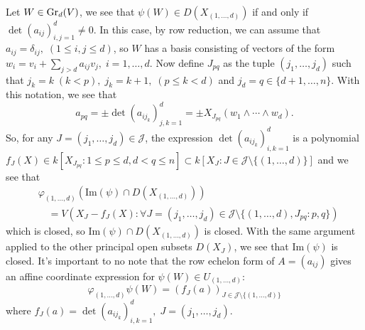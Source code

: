 Let $W\in\text{Gr}_d(V)$, we see that 
$\psi(W)\in D(X_{(1,\dots,d)})$ if and only if $\det(a_{ij})_{i,j=1}^d\neq0$. In this case, by row reduction, we can assume 
that $a_{ij}=\delta_{ij},\;(1\leq i,j\leq d)$, so $W$ has a basis 
consisting of vectors of the form $w_i = v_i+\sum_{j>d}a_{ij}v_j,\;i=1,\dots,d$. Now define $J_{pq}$ as the tuple 
$(j_1,\dots, j_d)$ such that $j_k=k\;(k < p),\;j_{k}=k+1,\;(p\leq k<d)$ and $j_d=q\in\{d+1,\dots,n\}$. With this notation, we 
see that 
\begin{equation}\label{equation: a_pq coefficients}
    a_{pq}=\pm\det(a_{ij_k})_{j,k=1}^d=\pm X_{J_{pq}}(w_1\wedge\cdots\wedge w_d).
\end{equation}
So, for any 
$J=(j_1,\dots,j_d)\in\mathcal{J}$, the expression $\det(a_{ij_k})_{i,k=1}^d$ is a polynomial 
$f_J(X)\in k[X_{J_{pq}}: 1\leq p\leq d, d<q\leq n]\subset k[X_J:J\in\mathcal{J}\setminus\{(1,\dots,d)\}]$ and we see that 
\begin{equation}\label{equation: local description of a Grassmanian}
    \begin{split}
        &\varphi_{(1,\dots,d)}(\text{Im}(\psi)\cap D(X_{(1,\dots,d)}))\\
        &\quad =V(X_J-f_J(X):\forall J=(j_1,\dots,j_d)\in\mathcal{J}\setminus\{(1,\dots,d), J_{pq}: p,q\})
    \end{split}
\end{equation}
which is closed, so $\text{Im}(\psi)\cap D(X_{(1,\dots,d)})$ is closed. With the same argument applied to the other 
principal open subsets $D(X_J)$, we see that $\text{Im}(\psi)$ is closed. It's important to no note that 
the row echelon form of $A=(a_{ij})$ gives an affine coordinate expression for $\psi(W)\in U_{(1,\dots,d)}$:
\begin{equation}
    \varphi_{(1,\dots,d)}\psi(W) = (f_J(a))_{J\in\mathcal{J}\setminus\{(1,\dots,d)\}}
\end{equation}
where $f_J(a)=\det(a_{ij_k})_{i,k=1}^d,\; J=(j_1,\dots,j_d)$.\par 

